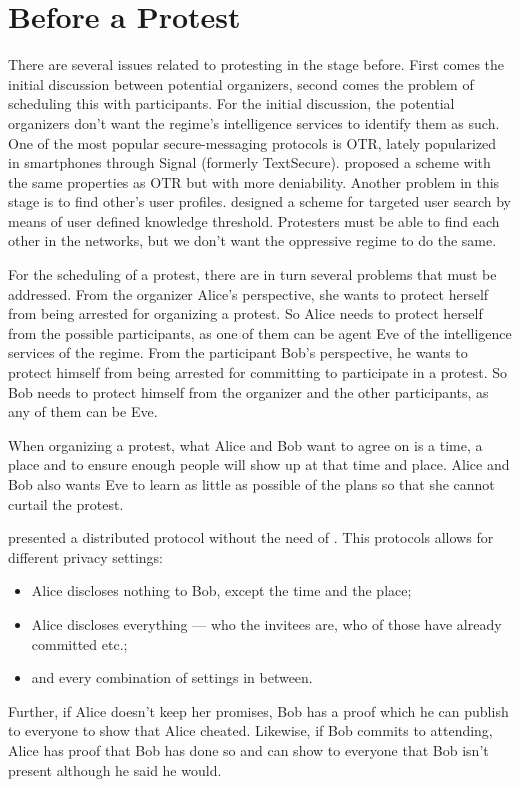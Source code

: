 \section{Before a Protest}
\label{BeforeProtest}

There are several issues related to protesting in the stage before.
First comes the initial discussion between potential organizers, second comes 
the problem of scheduling this with participants.
For the initial discussion, the potential organizers don't want the regime's 
intelligence services to identify them as such.
One of the most popular secure-messaging protocols is \ac{OTR}, lately 
popularized in smartphones through Signal (formerly TextSecure).
\citet{OTPKX} proposed a scheme with the same properties as \ac{OTR} but with 
more deniability.
Another problem in this stage is to find other's user profiles.
\citet{ThresholdUserSearch} designed a scheme for targeted user search by means 
of user defined knowledge threshold.
Protesters must be able to find each other in the networks, but we don't want 
the oppressive regime to do the same.

For the scheduling of a protest, there are in turn several problems that must 
be addressed.
From the organizer Alice's perspective, she wants to protect herself from being 
arrested for organizing a protest.
So Alice needs to protect herself from the possible participants, as one of 
them can be agent Eve of the intelligence services of the regime.
From the participant Bob's perspective, he wants to protect himself from being 
arrested for committing to participate in a protest.
So Bob needs to protect himself from the organizer and the other participants, 
as any of them can be Eve.

When organizing a protest, what Alice and Bob want to agree on is a time, 
a place and to ensure enough people will show up at that time and place.
Alice and Bob also wants Eve to learn as little as possible of the plans so 
that she cannot curtail the protest.

\citet{EventsInvitations} presented a distributed protocol without the need of 
.
This protocols allows for different privacy settings:
\begin{itemize}
\item Alice discloses nothing to Bob, except the time and the place;
\item Alice discloses everything --- who the invitees are, who of those have 
  already committed etc.;
\item and every combination of settings in between.
\end{itemize}
Further, if Alice doesn't keep her promises, Bob has a proof which he can 
publish to everyone to show that Alice cheated.
Likewise, if Bob commits to attending, Alice has proof that Bob has done so and 
can show to everyone that Bob isn't present although he said he would.

